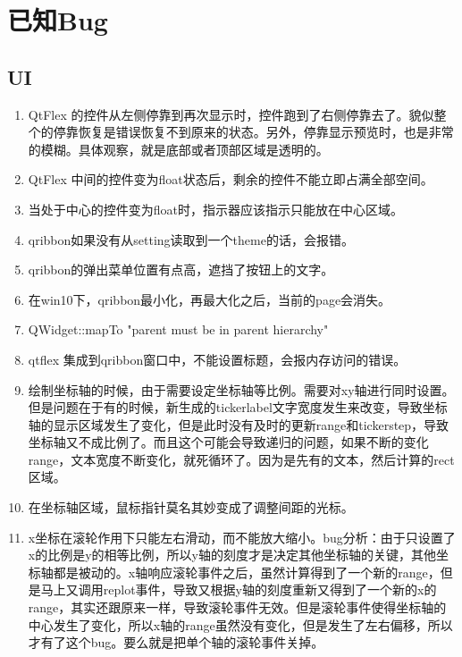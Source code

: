 \section{已知Bug}

\subsection{UI}

\begin{enumerate}
	\item QtFlex 的控件从左侧停靠到再次显示时，控件跑到了右侧停靠去了。貌似整个的停靠恢复是错误恢复不到原来的状态。另外，停靠显示预览时，也是非常的模糊。具体观察，就是底部或者顶部区域是透明的。
	\item QtFlex 中间的控件变为float状态后，剩余的控件不能立即占满全部空间。
	\item 当处于中心的控件变为float时，指示器应该指示只能放在中心区域。
	
	\item qribbon如果没有从setting读取到一个theme的话，会报错。
	
	\item qribbon的弹出菜单位置有点高，遮挡了按钮上的文字。
	
	\item 在win10下，qribbon最小化，再最大化之后，当前的page会消失。
	
	\item QWidget::mapTo "parent must be in parent hierarchy"
	
	\item qtflex 集成到qribbon窗口中，不能设置标题，会报内存访问的错误。
	
	\item 绘制坐标轴的时候，由于需要设定坐标轴等比例。需要对xy轴进行同时设置。但是问题在于有的时候，新生成的tickerlabel文字宽度发生来改变，导致坐标轴的显示区域发生了变化，但是此时没有及时的更新range和tickerstep，导致坐标轴又不成比例了。而且这个可能会导致递归的问题，如果不断的变化range，文本宽度不断变化，就死循环了。因为是先有的文本，然后计算的rect区域。
	
	\item 在坐标轴区域，鼠标指针莫名其妙变成了调整间距的光标。
	
	\item x坐标在滚轮作用下只能左右滑动，而不能放大缩小。bug分析：由于只设置了x的比例是y的相等比例，所以y轴的刻度才是决定其他坐标轴的关键，其他坐标轴都是被动的。x轴响应滚轮事件之后，虽然计算得到了一个新的range，但是马上又调用replot事件，导致又根据y轴的刻度重新又得到了一个新的x的range，其实还跟原来一样，导致滚轮事件无效。但是滚轮事件使得坐标轴的中心发生了变化，所以x轴的range虽然没有变化，但是发生了左右偏移，所以才有了这个bug。要么就是把单个轴的滚轮事件关掉。
	

\end{enumerate}
